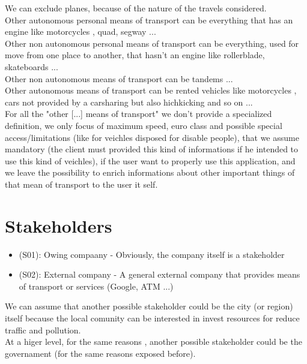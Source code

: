 \documentclass[a4paper]{book}
\begin{document}
We can exclude planes, because of the nature of the travels considered.\\

Other autonomous personal means of transport can be everything that has an engine like motorcycles , quad, segway ...\\

Other non autonomous personal means of transport can be everything, used for move from one place to another, that hasn't an engine like rollerblade, skateboards ...\\

Other non autonomous means of transport can be tandems ... \\

Other autonomous means of transport can be rented vehicles like motorcycles , cars not provided by a carsharing but also hichkicking and so on ... \\

For all the "other [...] means of transport" we don't provide a specialized definition, we only focus of maximum speed, euro class and possible special access/limitations (like for veichles disposed for disable people), that we assume mandatory (the client must provided this kind of informations if he intended to use this kind of veichles), if the user want to properly use this application, and we leave the possibility to enrich informations about other important things of that mean of transport to the user it self.\\ 


\section{Stakeholders}
\begin{itemize}

\item (S01): Owing compaany - Obviously, the company itself is a stakeholder
\item (S02): External company - A general external company that provides means of transport or services (Google, ATM ...)

\end{itemize}

We can assume that another possible stakeholder could be the city (or region) itself because the local comunity can be interested in invest resources for reduce traffic and pollution.\\

At a higer level, for the same reasons , another possible stakeholder could be the governament (for the same reasons exposed before).
\end{document}
